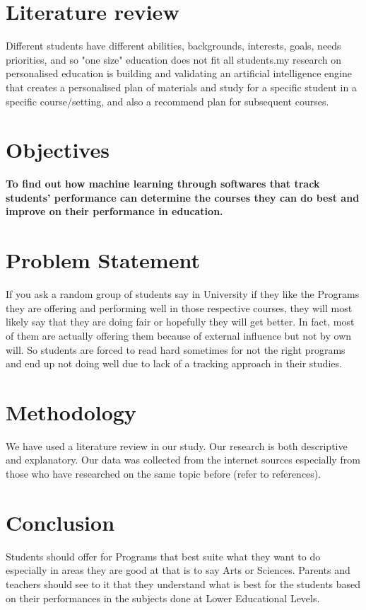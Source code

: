 \documentclass{article}
\begin{document}
\section{Literature review}

Different students have different abilities, backgrounds, interests, goals, needs priorities, and so "one size" education does not fit all students.my research on personalised education is building and validating an artificial intelligence engine that creates a personalised plan of materials and study for a specific student in a specific course/setting, and also a recommend plan for subsequent courses.


\section{Objectives}
\textbf{To find out how machine learning through softwares that track students' performance can determine the courses they can do best and improve on their performance in education.}

\section{Problem Statement}
If you ask a random group of students say in University if they like the Programs they are offering and performing well in those respective courses, they will most likely say that they are doing fair or hopefully they will get better. In fact, most of them are actually offering them because of external influence but not by own will. So students are forced to read hard sometimes for not the right programs and end up not doing well due to lack of a tracking approach in their studies.

\section{Methodology}
We have used a literature review in our study. Our research is both descriptive and explanatory. Our data was collected from the internet sources especially from those who have researched on the same topic before (refer to references).

\section{Conclusion}
Students should offer for Programs that best suite what they want to do especially in areas they are good at that is to say Arts or Sciences. Parents and teachers should see to it that they understand what is best for the students based on their performances in the subjects done at Lower Educational Levels.
\end{document}
